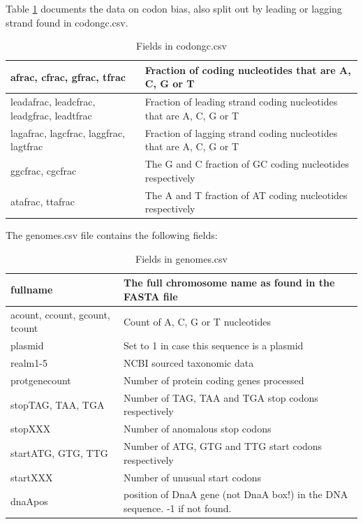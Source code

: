 \documentclass[fleqn,10pt]{wlscirep}
\begin{document}
Table \ref{tab:codongc-table} documents the data on codon bias, also split out by leading or lagging strand found in codongc.csv.
\begin{table}[H]
\begin{tabular}{|l|l|}
\hline
afrac, cfrac, gfrac, tfrac                 & Fraction of coding nucleotides that are A, C, G or T                \\ \hline
leadafrac, leadcfrac, leadgfrac, leadtfrac & Fraction of leading strand coding nucleotides that are A, C, G or T \\ \hline
lagafrac, lagcfrac, laggfrac, lagtfrac     & Fraction of lagging strand coding nucleotides that are A, C, G or T \\ \hline
ggcfrac, cgcfrac                           & The G and C fraction of GC coding nucleotides respectively          \\ \hline
atafrac, ttafrac                           & The A and T fraction of AT coding nucleotides respectively          \\ \hline
\end{tabular}
\caption{Fields in codongc.csv}
\label{tab:codongc-table}
\end{table}

The genomes.csv file contains the following fields:

\begin{table}[H]
\begin{tabular}{|l|l|}
  \hline
fullname                 & The full chromosome name as found in the FASTA file                \\ \hline
acount, ccount, gcount, tcount                 & Count of A, C, G or T nucleotides                \\ \hline
plasmid & Set to 1 in case this sequence is a plasmid \\ \hline
realm1-5     & NCBI sourced taxonomic data \\ \hline
protgenecount                           & Number of protein coding genes processed          \\ \hline
stopTAG, TAA, TGA & Number of TAG, TAA and TGA stop codons respectively          \\ \hline
stopXXX & Number of anomalous stop codons  \\ \hline
startATG, GTG, TTG & Number of ATG, GTG and TTG start codons respectively          \\ \hline
startXXX & Number of unusual start codons  \\ \hline
dnaApos & position of DnaA gene (not DnaA box!) in the DNA sequence. -1 if not found.  \\ \hline
\end{tabular}
\caption{Fields in genomes.csv}
\label{tab:genomes-table}
\end{table}
\end{document}
